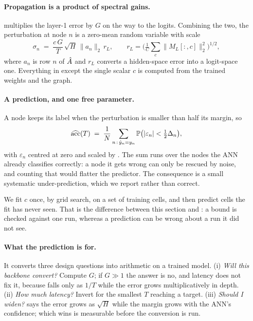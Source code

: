 \paragraph{Propagation is a product of spectral gains.}
 multiplies the layer-1 error by $G$ on the way to the logits. Combining the two, the
perturbation at node $n$ is a zero-mean random variable with scale
\begin{equation}
\sigma_{n} \;=\; \frac{c\,G}{T}\,\sqrt{H}\,\lVert a_{n}\rVert_{2}\,r_{L},
\qquad r_{L}=\Big(\tfrac{1}{C}\sum_{c}\lVert M_{L}[:,c]\rVert_{2}^{2}\Big)^{1/2},
\label{eq:sigma}
\end{equation}
where $a_{n}$ is row $n$ of $\hat{A}$ and $r_{L}$ converts a hidden-space error into a logit-space one.
Everything in  except the single scalar $c$ is computed from the trained weights and
the graph.

\paragraph{A prediction, and one free parameter.}
A node keeps its label when the perturbation is smaller than half its margin, so
\begin{equation}
\widehat{\mathrm{acc}}(T) \;=\; \frac{1}{N}\sum_{n\,:\,\hat{y}_{n}=y_{n}}
\mathbb{P}\big(|\varepsilon_{n}|<\tfrac{1}{2}\Delta_{n}\big),
\label{eq:predacc}
\end{equation}
with $\varepsilon_{n}$ centred at zero and scaled by . The sum runs over the nodes the
ANN already classifies correctly: a node it gets wrong can only be rescued by noise, and counting that
would flatter the predictor. The consequence is a small systematic under-prediction, which we report
rather than correct.

We fit $c$ once, by grid search, on a set of training cells, and then predict cells the fit has never
seen. That is the difference between this section and : a bound is checked against
one run, whereas a prediction can be wrong about a run it did not see.

\paragraph{What the prediction is for.}
It converts three design questions into arithmetic on a trained model. (i) \emph{Will this backbone
convert?} Compute $G$; if $G\gg1$ the answer is no, and latency does not fix it, because
 falls only as $1/T$ while the error grows multiplicatively in depth. (ii) \emph{How
much latency?} Invert  for the smallest $T$ reaching a target. (iii) \emph{Should I
widen?}  says the error grows as $\sqrt{H}$ while the margin grows with the ANN's
confidence; which wins is measurable before the conversion is run.

